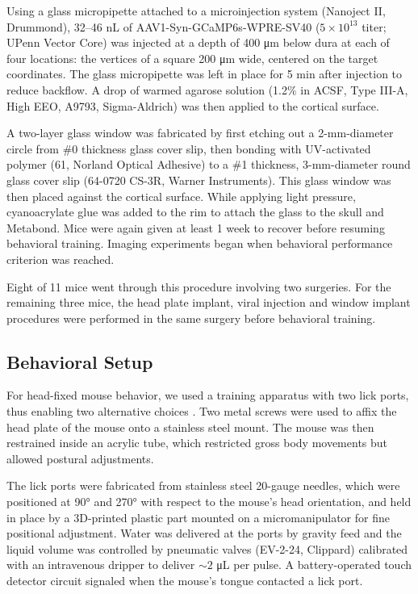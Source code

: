 Using a glass micropipette attached to a microinjection system (Nanoject II, Drummond), 32--46 nL of AAV1-Syn-GCaMP6s-WPRE-SV40 ($5 \times 10^{13}$ titer; UPenn Vector Core) was injected at a depth of 400 \si{\um} below dura at each of four locations: the vertices of a square 200 \si{\um} wide, centered on the target coordinates. The glass micropipette was left in place for 5 min after injection to reduce backflow. A drop of warmed agarose solution (1.2\% in ACSF, Type III-A, High EEO, A9793, Sigma-Aldrich) was then applied to the cortical surface. 

A two-layer glass window was fabricated by first etching out a 2-mm-diameter circle from \#0 thickness glass cover slip, then bonding with UV-activated polymer (61, Norland Optical Adhesive) to a \#1 thickness, 3-mm-diameter round glass cover slip (64-0720 CS-3R, Warner Instruments). This glass window was then placed against the cortical surface. While applying light pressure, cyanoacrylate glue was added to the rim to attach the glass to the skull and Metabond. Mice were again given at least 1 week to recover before resuming behavioral training. Imaging experiments began when behavioral performance criterion was reached. 

Eight of 11 mice went through this procedure involving two surgeries. For the remaining three mice, the head plate implant, viral injection and window implant procedures were performed in the same surgery before behavioral training.

\subsection*{Behavioral Setup}
For head-fixed mouse behavior, we used a training apparatus with two lick ports, thus enabling two alternative choices \citep{guo2014flow}. Two metal screws were used to affix the head plate of the mouse onto a stainless steel mount. The mouse was then restrained inside an acrylic tube, which restricted gross body movements but allowed postural adjustments. 

The lick ports were fabricated from stainless steel 20-gauge needles, which were positioned at \ang{90} and \ang{270} with respect to the mouse's head orientation, and held in place by a 3D-printed plastic part mounted on a micromanipulator for fine positional adjustment. Water was delivered at the ports by gravity feed and the liquid volume was controlled by pneumatic valves (EV-2-24, Clippard) calibrated with an intravenous dripper to deliver $\sim 2$ \si{\uL} per pulse. A battery-operated touch detector circuit signaled when the mouse's tongue contacted a lick port. 

